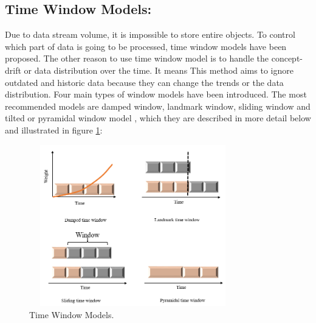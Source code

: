 \documentclass[../UNBThesis2.tex]{subfiles}
\begin{document}
\subsection{Time Window Models:}
Due to data stream volume, it is impossible to store entire objects. To control which part of data is going to be processed, time window models have been proposed. The other reason to use time window model is to handle the concept-drift or data distribution over the time. It means This method aims to ignore outdated and historic data because they can change the trends or the data distribution.
Four main types of window models have been introduced. The most recommended models are damped window, landmark window, sliding window and tilted or pyramidal window model \cite{nguyen2015survey, mansalis2018evaluation}, which they are described in more detail below and illustrated in figure \ref{time1}:

\begin{figure}[!h]
\centering
\includegraphics[width = 9cm,height = 7cm]{image/timeW.PNG}
\caption{Time Window Models.}
\label{time1}
\end{figure}
\end{document}
